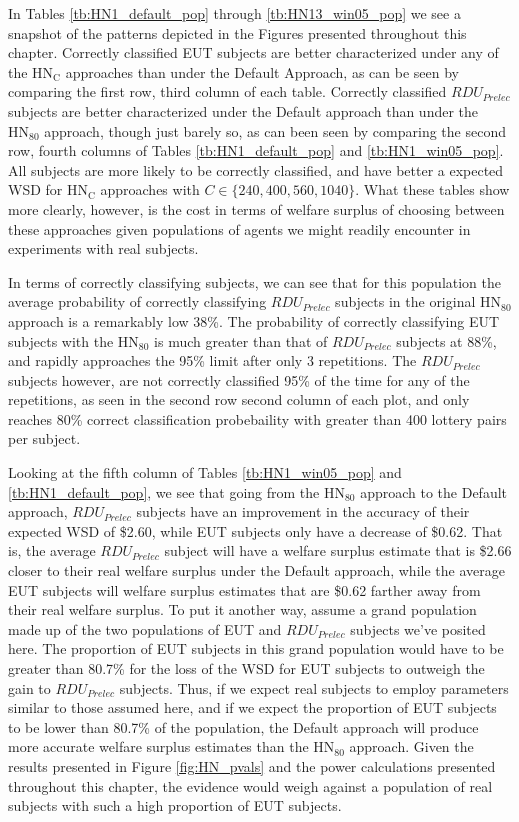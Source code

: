 \documentclass[../main.tex]{subfiles}
\begin{document}
In Tables \ref{tb:HN1_default_pop} through \ref{tb:HN13_win05_pop} we see a snapshot of the patterns depicted in the Figures presented throughout this chapter.
Correctly classified EUT subjects are better characterized under any of the $\text{HN}_\text{C}$ approaches than under the Default Approach, as can be seen by comparing the first row, third column of each table.
Correctly classified $\mathit{RDU_{Prelec}}$ subjects are better characterized under the Default approach than under the $\text{HN}_{80}$ approach, though just barely so, as can been seen by comparing the second row, fourth columns of Tables \ref{tb:HN1_default_pop} and \ref{tb:HN1_win05_pop}.
All subjects are more likely to be correctly classified, and have better a expected WSD for $\text{HN}_\text{C}$ approaches with $C \in \lbrace 240, 400, 560, 1040\rbrace$.
What these tables show more clearly, however, is the cost in terms of welfare surplus of choosing between these approaches given populations of agents we might readily encounter in experiments with real subjects.

In terms of correctly classifying subjects, we can see that for this population the average probability of correctly classifying $\mathit{RDU_{Prelec}}$ subjects in the original $\text{HN}_{80}$ approach is a remarkably low 38\%.
The probability of correctly classifying EUT subjects with the $\text{HN}_{80}$ is much greater than that of $\mathit{RDU_{Prelec}}$ subjects at 88\%, and rapidly approaches the 95\% limit after only 3 repetitions.
The $\mathit{RDU_{Prelec}}$ subjects however, are not correctly classified 95\% of the time for any of the repetitions, as seen in the second row second column of each plot, and only reaches 80\% correct classification probebaility with greater than 400 lottery pairs per subject.

Looking at the fifth column of Tables \ref{tb:HN1_win05_pop} and \ref{tb:HN1_default_pop}, we see that going from the $\text{HN}_{80}$ approach to the Default approach, $\mathit{RDU_{Prelec}}$ subjects have an improvement in the accuracy of their expected WSD of \$2.60, while EUT subjects only have a decrease of \$0.62.
That is, the average $\mathit{RDU_{Prelec}}$ subject will have a welfare surplus estimate that is \$2.66 closer to their real welfare surplus under the Default approach, while the average EUT subjects will welfare surplus estimates that are \$0.62 farther away from their real welfare surplus.
To put it another way, assume a grand population made up of the two populations of EUT and $\mathit{RDU_{Prelec}}$ subjects we've posited here.
The proportion of EUT subjects in this grand population would have to be greater than 80.7\% for the loss of the WSD for EUT subjects to outweigh the gain to $\mathit{RDU_{Prelec}}$ subjects.{\footnotemark}
Thus, if we expect real subjects to employ parameters similar to those assumed here, and if we expect the proportion of EUT subjects to be lower than  80.7\% of the population, the Default approach will produce more accurate welfare surplus estimates than the $\text{HN}_{80}$ approach.
Given the results presented in Figure \ref{fig:HN_pvals} and the power calculations presented throughout this chapter, the evidence would weigh against a population of real subjects with such a high proportion of EUT subjects.
\end{document}
